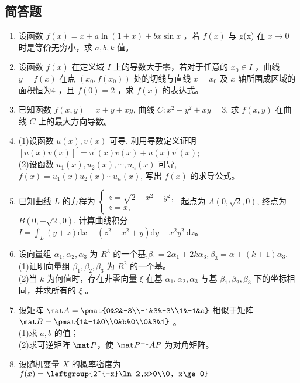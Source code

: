 \subsection{简答题}
\begin{enumerate}
\item 设函数 $f(x)=x+a\ln(1+x)+bx\sin x$ ，若 $f(x)$ 与 g(x) 在 $x \to 0$ 时是等价无穷小，求 $a,b,k$ 值。
\item  设函数 $f(x)$ 在定义域 $I$ 上的导数大于零，若对于任意的 $x_0 \in I$ ，曲线 $y=f(x)$ 在点 $(x_0,f(x_0))$ 处的切线与直线 $x=x_0$ 及 $x$ 轴所围成区域的面积恒为4 ，且 $f(0)=2$ ，求 $f(x)$ 的表达式。
\item  已知函数 $f(x, y)=x+y+x y$, 曲线 $C: x^2+y^2+x y=3$, 求 $f(x, y)$ 在曲线 $C$ 上的最大方向导数。
\item (1)设函数 $u(x), v(x)$ 可导, 利用导数定义证明 $[u(x) v(x)]^{\prime}=u^{\prime}(x) v(x)+u(x) v^{\prime}(x)$;\\
(2)设函数 $u_1(x), u_2(x), \cdots, u_n(x)$ 可导, $f(x)=u_1(x) u_2(x) \cdots u_n(x)$, 写出 $f(x)$ 的求导公式。
\item 已知曲线 $L$ 的方程为 $\left\{\begin{array}{l}z=\sqrt{2-x^2-y^2}, \\ z=x,\end{array}\right.$ 起点为 $A(0, \sqrt{2}, 0)$, 终点为 $B(0,-\sqrt{2}, 0)$, 计算曲线积分 $I=\int_L(y+z) \mathrm{d} x+\left(z^2-x^2+y\right) \mathrm{d} y+x^2 y^2 \mathrm{~d} z$。
\item  设向量组 $\alpha_1,\alpha_2,\alpha_3$ 为 $R^3$ 的一个基,$\beta_1=2\alpha_1+2k\alpha_3,\beta_3=\alpha+(k+1)\alpha_3$.\\
(1)证明向量组  $\beta_1,\beta_2,\beta_3$ 为 $R^2$ 的一个基。\\
(2)当 $k$ 为何值时，存在非零向量 $\xi$ 在基  $\alpha_1,\alpha_2,\alpha_3$ 与基  $\beta_1,\beta_2,\beta_3$ 下的坐标相同，并求所有的 $\xi$ 。
\item 设矩阵 $\mat A=\pmat{0&2&-3\\-1&3&-3\\1&-1&a}$ 相似于矩阵 $\mat B=\pmat{1&-1&0\\0&b&0\\0&3&1}$ 。\\
(1)求 $a,b$ 的值；\\
(2)求可逆矩阵 $\mat P$，使 $\mat P^{-1}AP$  为对角矩阵。
\item 设随机变量 $X$ 的概率密度为 $f(x)=\leftgroup{2^{-x}\ln 2,x>0\\0, x\ge 0}$

\end{enumerate}

